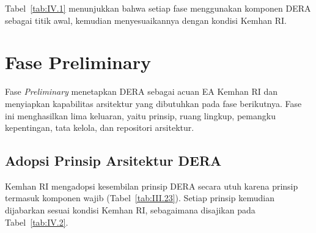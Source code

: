 Tabel~\ref{tab:IV.1} menunjukkan bahwa setiap fase menggunakan komponen DERA sebagai titik awal, kemudian menyesuaikannya dengan kondisi Kemhan RI.

\section{Fase Preliminary}
\label{sec:IV.2}

Fase \textit{Preliminary} menetapkan DERA sebagai acuan EA Kemhan RI dan menyiapkan kapabilitas arsitektur yang dibutuhkan pada fase berikutnya. Fase ini menghasilkan lima keluaran, yaitu prinsip, ruang lingkup, pemangku kepentingan, tata kelola, dan repositori arsitektur.

\subsection{Adopsi Prinsip Arsitektur DERA}
\label{sec:IV.2.1}

Kemhan RI mengadopsi kesembilan prinsip DERA secara utuh karena prinsip termasuk komponen wajib (Tabel~\ref{tab:III.23}). Setiap prinsip kemudian dijabarkan sesuai kondisi Kemhan RI, sebagaimana disajikan pada Tabel~\ref{tab:IV.2}.

